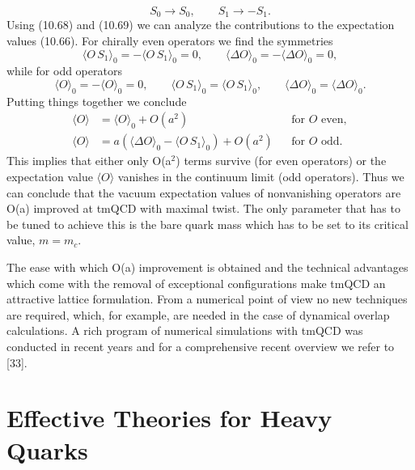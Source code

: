 \begin{equation}
  S_0 \longrightarrow S_0 , \qquad S_1 \longrightarrow -S_1 .
\end{equation}
Using (10.68) and (10.69) we can analyze the contributions to the expectation
values (10.66). For chirally even operators we find the symmetries
\begin{equation}
  \langle O\,S_1\rangle_0 = -\langle O\,S_1\rangle_0 = 0 , \qquad
  \langle\Delta O\rangle_0 = -\langle\Delta O\rangle_0 = 0 ,
\end{equation}
while for odd operators
\begin{equation}
  \langle O\rangle_0 = -\langle O\rangle_0 = 0 , \qquad
  \langle O\,S_1\rangle_0 = \langle O\,S_1\rangle_0 , \qquad
  \langle\Delta O\rangle_0 = \langle\Delta O\rangle_0 .
\end{equation}
Putting things together we conclude
\begin{equation}
  \begin{aligned}
    \langle O\rangle &= \langle O\rangle_0 + O(a^2)
    && \text{for } O \text{ even} , \\
    \langle O\rangle &= a\left(\langle\Delta O\rangle_0
    - \langle O\,S_1\rangle_0\right) + O(a^2)
    && \text{for } O \text{ odd} .
  \end{aligned}
\end{equation}
This implies that either only O(a$^2$) terms survive (for even operators) or
the expectation value $\langle O\rangle$ vanishes in the continuum limit (odd
operators). Thus we can conclude that the vacuum expectation values of
nonvanishing operators are O(a) improved at tmQCD with maximal twist. The only
parameter that has to be tuned to achieve this is the bare quark mass which
has to be set to its critical value, $m = m_c$.

The ease with which O(a) improvement is obtained and the technical advantages
which come with the removal of exceptional configurations make tmQCD an
attractive lattice formulation. From a numerical point of view no new
techniques are required, which, for example, are needed in the case of
dynamical overlap calculations. A rich program of numerical simulations with
tmQCD was conducted in recent years and for a comprehensive recent overview we
refer to [33].

\section{Effective Theories for Heavy Quarks}

